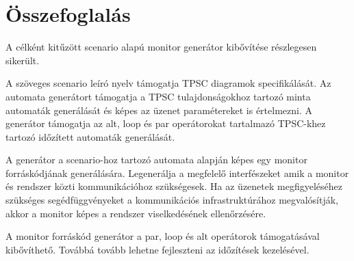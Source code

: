 \chapter{Összefoglalás}

A célként kitűzött scenario alapú monitor generátor kibővítése részlegesen sikerült.

A szöveges scenario leíró nyelv támogatja TPSC diagramok specifikálását. Az automata generátort támogatja a TPSC tulajdonságokhoz tartozó minta automaták generálását és képes az üzenet paramétereket is értelmezni. A generátor támogatja az alt, loop és par operátorokat tartalmazó TPSC-khez tartozó időzített automaták generálását.

A generátor a scenario-hoz tartozó automata alapján képes egy monitor forráskódjának generálására. Legenerálja a megfelelő interfészeket amik a monitor és rendszer közti kommunikációhoz szükségesek. Ha az üzenetek megfigyeléséhez szükséges segédfüggvényeket a kommunikációs infrastruktúrához megvalósítják, akkor a monitor képes a rendszer viselkedésének ellenőrzésére.

A monitor forráskód generátor a par, loop és alt operátorok támogatásával kibővíthető. Továbbá tovább lehetne fejleszteni az időzítések kezelésével.